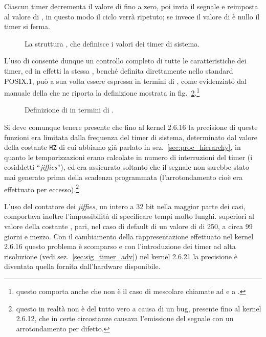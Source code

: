 Ciascun timer decrementa il valore di  fino a zero, poi invia
il segnale e reimposta  al valore di , in
questo modo il ciclo verrà ripetuto; se invece il valore di 
è nullo il timer si ferma.

\begin{figure}[!htb]
  \footnotesize \centering
  \begin{minipage}[c]{0.8\textwidth}
  \end{minipage} 
  \normalsize 
  \caption{La struttura , che definisce i valori dei timer
    di sistema.}
  \label{fig:sig_itimerval}
\end{figure}

L'uso di  consente dunque un controllo completo di tutte le
caratteristiche dei timer, ed in effetti la stessa , benché
definita direttamente nello standard POSIX.1, può a sua volta essere espressa
in termini di , come evidenziato dal manuale della 
\cite{GlibcMan} che ne riporta la definizione mostrata in
fig.~\ref{fig:sig_alarm_def}.\footnote{questo comporta anche che non è il caso
  di mescolare chiamate ad  e a .}

\begin{figure}[!htb]
  \footnotesize \centering
  \begin{minipage}[c]{0.8\textwidth}
  \end{minipage} 
  \normalsize 
  \caption{Definizione di  in termini di .} 
  \label{fig:sig_alarm_def}
\end{figure}

Si deve comunque tenere presente che fino al kernel 2.6.16 la precisione di
queste funzioni era limitata dalla frequenza del timer di sistema, determinato
dal valore della costante \texttt{HZ} di cui abbiamo già parlato in
sez.~\ref{sec:proc_hierarchy}, in quanto le temporizzazioni erano calcolate in
numero di interruzioni del timer (i cosiddetti ``\textit{jiffies}''), ed era
assicurato soltanto che il segnale non sarebbe stato mai generato prima della
scadenza programmata (l'arrotondamento cioè era effettuato per
eccesso).\footnote{questo in realtà non è del tutto vero a causa di un bug,
  presente fino al kernel 2.6.12, che in certe circostanze causava l'emissione
  del segnale con un arrotondamento per difetto.}

L'uso del contatore dei \textit{jiffies}, un intero a 32 bit nella maggior
parte dei casi, comportava inoltre l'impossibilità di specificare tempi molto
lunghi. superiori al valore della costante ,
pari, nel caso di default di un valore di  di 250, a circa 99 giorni
e mezzo. Con il cambiamento della rappresentazione effettuato nel kernel
2.6.16 questo problema è scomparso e con l'introduzione dei timer ad alta
risoluzione (vedi sez.~\ref{sec:sig_timer_adv}) nel kernel 2.6.21 la
precisione è diventata quella fornita dall'hardware disponibile.

